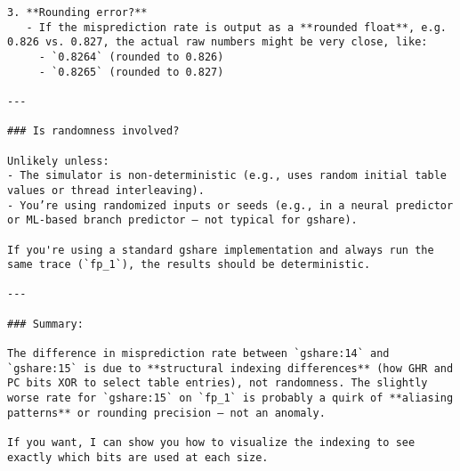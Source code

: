 \documentclass[sigconf, screen]{acmart}
\begin{document}
\begin{Verbatim}[fontsize=\tiny, breaklines=true]
3. **Rounding error?**
   - If the misprediction rate is output as a **rounded float**, e.g. 0.826 vs. 0.827, the actual raw numbers might be very close, like:
     - `0.8264` (rounded to 0.826)
     - `0.8265` (rounded to 0.827)

---

### Is randomness involved?

Unlikely unless:
- The simulator is non-deterministic (e.g., uses random initial table values or thread interleaving).
- You’re using randomized inputs or seeds (e.g., in a neural predictor or ML-based branch predictor — not typical for gshare).

If you're using a standard gshare implementation and always run the same trace (`fp_1`), the results should be deterministic.

---

### Summary:

The difference in misprediction rate between `gshare:14` and `gshare:15` is due to **structural indexing differences** (how GHR and PC bits XOR to select table entries), not randomness. The slightly worse rate for `gshare:15` on `fp_1` is probably a quirk of **aliasing patterns** or rounding precision — not an anomaly.

If you want, I can show you how to visualize the indexing to see exactly which bits are used at each size.
\end{Verbatim}

\thispagestyle{ack_footer}
\end{document}
